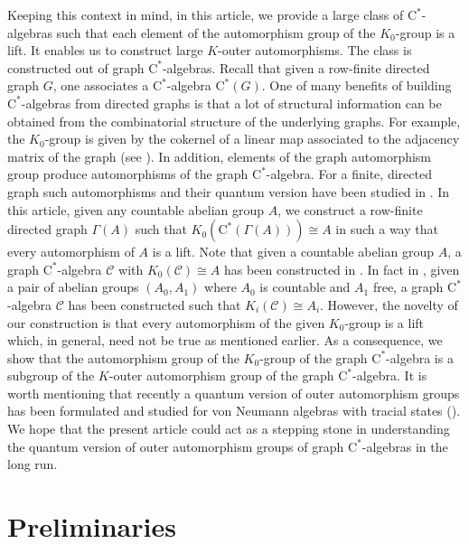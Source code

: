 \documentclass[a4paper,11pt,reqno]{amsart}
\theoremstyle{plain}
\theoremstyle{named}
\numberwithin{equation}{section}
\begin{document}
           \indent Keeping this context in mind, in this article, we provide a large class of $\textrm{C}^{\ast}$-algebras such that each element of the automorphism group of the $K_{0}$-group is a lift. It enables us to construct large $K$-outer automorphisms. The class is constructed out of graph $\textrm{C}^{\ast}$-algebras. Recall that given a row-finite directed graph $G$, one associates a $\textrm{C}^{\ast}$-algebra $\textrm{C}^{\ast}(G)$. One of many benefits of building $\textrm{C}^{\ast}$-algebras from directed graphs is that a lot of structural information can be obtained from the combinatorial structure of the underlying graphs. For example, the $K_{0}$-group is given by the cokernel of a linear map associated to the adjacency matrix of the graph (see \cite{raeburn}). In addition, elements of the graph automorphism group produce automorphisms of the graph $\textrm{C}^{\ast}$-algebra. For a finite, directed graph such automorphisms and their quantum version have been studied in \cite{joardar}. In this article, given any countable abelian group $A$, we construct a row-finite directed graph $\Gamma(A)$ such that $K_{0}(\textrm{C}^{\ast}(\Gamma(A)))\cong A$ in such a way that every automorphism of $A$ is a lift. Note that given a countable abelian group $A$, a graph $\textrm{C}^{\ast}$-algebra $\mathcal{C}$ with $K_{0}(\mathcal{C})\cong A$ has been constructed in \cite{sz}. In fact in \cite{sz}, given a pair of abelian groups $(A_{0},A_{1})$ where $A_{0}$ is countable and $A_{1}$ free, a graph $\textrm{C}^{\ast}$-algebra $\mathcal{C}$ has been constructed such that $K_{i}(\mathcal{C})\cong A_{i}$. However, the novelty of our construction is that every automorphism of the given $K_{0}$-group is a lift which, in general, need not be true as mentioned earlier. As a consequence, we show that the automorphism group of the $K_{0}$-group of the graph $\textrm{C}^{\ast}$-algebra is a subgroup of the $K$-outer automorphism group of the graph $\textrm{C}^{\ast}$-algebra. It is worth mentioning that recently a quantum version of outer automorphism groups has been formulated and studied for von Neumann algebras with tracial states (\cite{goswami}). We hope that the present article could act as a stepping stone in understanding the quantum version of outer automorphism groups of graph $\textrm{C}^{\ast}$-algebras in the long run.   

            \section{Preliminaries}
\end{document}
